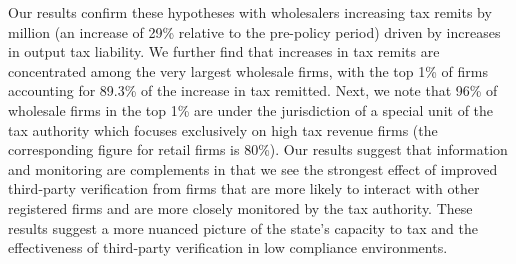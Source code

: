 Our results confirm these hypotheses with wholesalers increasing tax remits by  million (an increase of 29\% relative to the pre-policy period) driven by increases in output tax liability. We further find that increases in tax remits are concentrated among the very largest wholesale firms, with the top 1\% of firms accounting for 89.3\% of the increase in tax remitted.  Next, we note that 96\% of wholesale firms in the top 1\% are under the jurisdiction of a special unit of the tax authority which focuses exclusively on high tax revenue firms (the corresponding figure for retail firms is 80\%). Our results suggest that information and monitoring are complements in that we see the strongest effect of improved third-party verification from firms that are more likely to interact with other registered firms and are more closely monitored by the tax authority. These results suggest a more nuanced picture of the state's capacity to tax and the effectiveness of third-party verification in low compliance environments.






